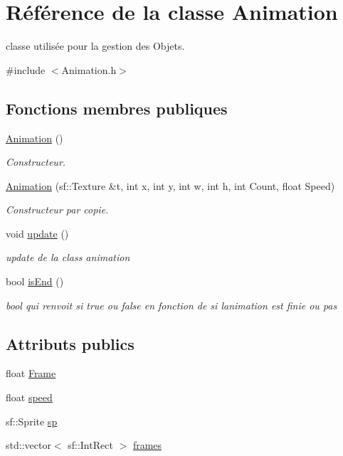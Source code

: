 \hypertarget{class_animation}{}\section{Référence de la classe Animation}
\label{class_animation}


classe utilisée pour la gestion des Objets.  




{\ttfamily \#include $<$Animation.\+h$>$}

\subsection*{Fonctions membres publiques}
\begin{DoxyCompactItemize}
\item 
\hyperlink{class_animation_a83f0a16cef7117f187ad596de38dd9d6}{Animation} ()
\begin{DoxyCompactList}\small\item\em Constructeur. \end{DoxyCompactList}\item 
\hyperlink{class_animation_ae7996741e4f76cd23626f60d6ad0e33b}{Animation} (sf\+::\+Texture \&t, int x, int y, int w, int h, int Count, float Speed)
\begin{DoxyCompactList}\small\item\em Constructeur par copie. \end{DoxyCompactList}\item 
void \hyperlink{class_animation_a4318baf0b0735e7da87b2c6d3d3a2705}{update} ()
\begin{DoxyCompactList}\small\item\em update de la class animation \end{DoxyCompactList}\item 
bool \hyperlink{class_animation_a145061ea983f4f4000155a0196f74bfc}{is\+End} ()
\begin{DoxyCompactList}\small\item\em bool qui renvoit si true ou false en fonction de si l\textquotesingle{}animation est finie ou pas \end{DoxyCompactList}\end{DoxyCompactItemize}
\subsection*{Attributs publics}
\begin{DoxyCompactItemize}
\item 
float \hyperlink{class_animation_a2c7bd0213e063da804e2bec388587399}{Frame}
\item 
float \hyperlink{class_animation_a68079384a94a0ebdba03241f1937608e}{speed}
\item 
sf\+::\+Sprite \hyperlink{class_animation_a6c359fdd53ab0539caa9e073cc1b0613}{sp}
\item 
std\+::vector$<$ sf\+::\+Int\+Rect $>$ \hyperlink{class_animation_a25d2fc2d769f9ff7eda63bff7cd8e958}{frames}
\end{DoxyCompactItemize}


